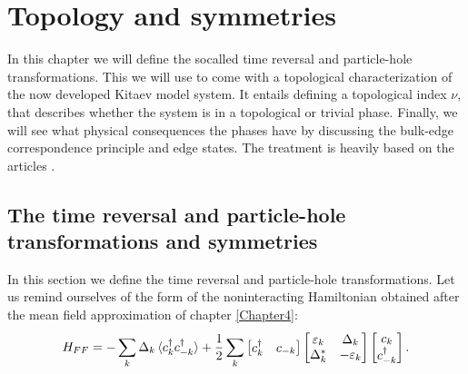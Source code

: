 
\chapter{Topology and symmetries} %

\label{Chapter7} %


In this chapter we will define the socalled time reversal and particle-hole transformations. This we will use to come with a topological characterization of the now developed Kitaev model system. It entails defining a topological index $\nu$, that describes whether the system is in a topological or trivial phase. Finally, we will see what physical consequences the phases have by discussing the bulk-edge correspondence principle and edge states. The treatment is heavily based on the articles \cite{Ludwig.Topology, Chiu.Topology, Alicea}. 

\section{The time reversal and particle-hole transformations and symmetries}
\label{sec.SymmetriesTRandPH}
In this section we define the time reversal and particle-hole transformations. Let us remind ourselves of the form of the noninteracting Hamiltonian obtained after the mean field approximation of chapter \ref{Chapter4}: 
\begin{equation}
H_{FF} = -\sum_k \Delta_k \braket {c^\dagger_k c^\dagger_{-k}} + \frac{1}{2}\sum_{k} \begin{bmatrix} c^\dagger_k & c_{-k} \end{bmatrix} \begin{bmatrix} \varepsilon_k & \Delta_k \\ \Delta^*_k & -\varepsilon_k \end{bmatrix} \begin{bmatrix} c_k \\ c^\dagger_{-k} \end{bmatrix}. \nonumber 
\end{equation}

